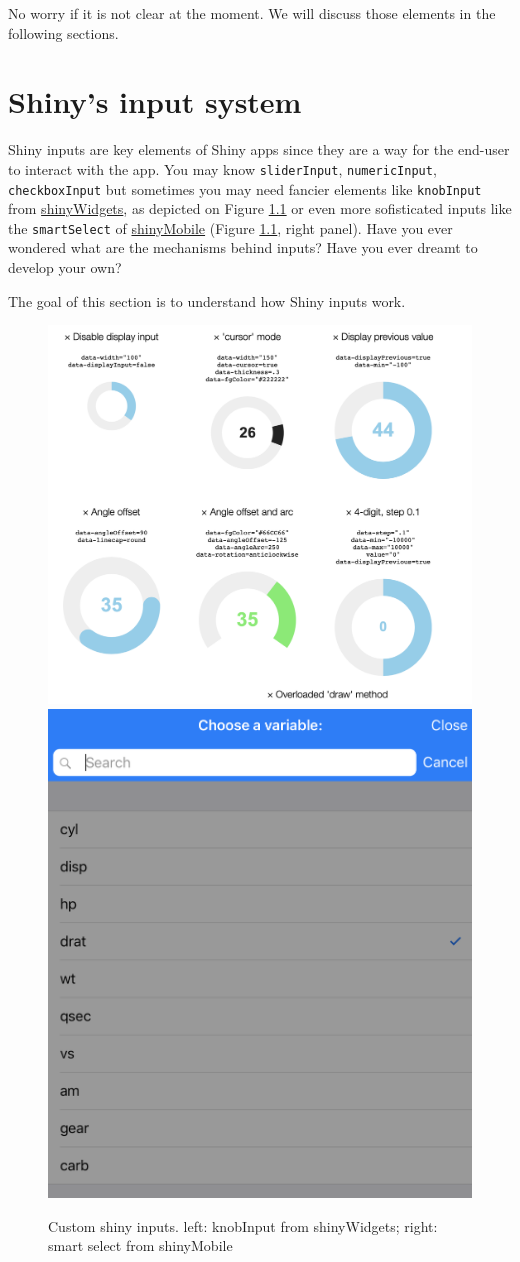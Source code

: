 \documentclass[
]{book}
\begin{document}
No worry if it is not clear at the moment. We will discuss those elements in the following sections.

\hypertarget{shiny-input-system}{%
\chapter{Shiny's input system}\label{shiny-input-system}}

Shiny inputs are key elements of Shiny apps since they are a way for the end-user to interact with the app. You may know \texttt{sliderInput}, \texttt{numericInput}, \texttt{checkboxInput} but sometimes you may need fancier elements like \texttt{knobInput} from \href{https://github.com/dreamRs/shinyWidgets/blob/master/R/input-knob.R}{shinyWidgets}, as depicted on Figure \ref{fig:fancy-inputs} or even more sofisticated inputs like the \texttt{smartSelect} of \href{https://github.com/RinteRface/shinyMobile/blob/master/R/f7-inputs.R}{shinyMobile} (Figure \ref{fig:fancy-inputs}, right panel). Have you ever wondered what are the mechanisms behind inputs? Have you ever dreamt to develop your own?

The goal of this section is to understand how Shiny inputs work.

\begin{figure}
\includegraphics[width=0.5\linewidth]{images/survival-kit/jquery-knobs} \includegraphics[width=0.5\linewidth]{images/survival-kit/smart-select} \caption{Custom shiny inputs. left: knobInput from shinyWidgets; right: smart select from shinyMobile}\label{fig:fancy-inputs}
\end{figure}
\end{document}
